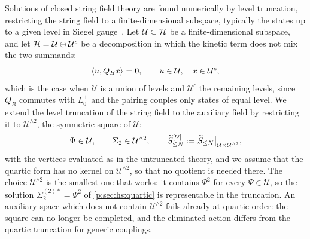 Solutions of closed string field theory are found numerically by level truncation, restricting the string field to a finite-dimensional subspace, typically the states up to a given level in Siegel gauge~\cite{Yang:2005:ClosedStringTachyon}.
Let $\mathcal U \subset \Hs$ be a finite-dimensional subspace, and let $\Hs = \mathcal U \oplus \mathcal U^c$ be a decomposition in which the kinetic term does not mix the two summands:
\begin{equation}
  \label{p:eq:sol:kinetic-block}
  \pair{u}{Q_B x}
    = 0,
  \qquad
  u \in \mathcal U,
  \quad
  x \in \mathcal U^c,
\end{equation}
which is the case when $\mathcal U$ is a union of levels and $\mathcal U^c$ the remaining levels, since $Q_B$ commutes with $L_0^+$ and the pairing couples only states of equal level.
We extend the level truncation of the string field to the auxiliary field by restricting it to $\mathcal U^{\wedge 2}$, the symmetric square of $\mathcal U$:
\begin{equation}
  \label{p:eq:sol:truncation}
  \Psi
    \in \mathcal U,
  \qquad
  \Sigma_2
    \in \mathcal U^{\wedge 2},
  \qquad
  \caction[\le N]^{[\mathcal U]}
    := \caction[\le N] \big|_{\mathcal U \times \mathcal U^{\wedge 2}},
\end{equation}
with the vertices evaluated as in the untruncated theory, and we assume that the quartic form has no kernel on $\mathcal U^{\wedge 2}$, so that no quotient is needed there.
The choice $\mathcal U^{\wedge 2}$ is the smallest one that works: it contains $\Psi^2$ for every $\Psi \in \mathcal U$, so the solution $\Sigma_2^{(2)*} = \Psi^2$ of \cref{p:sec:hs:quartic} is representable in the truncation.
An auxiliary space which does not contain $\mathcal U^{\wedge 2}$ fails already at quartic order: the square can no longer be completed, and the eliminated action differs from the quartic truncation for generic couplings.

